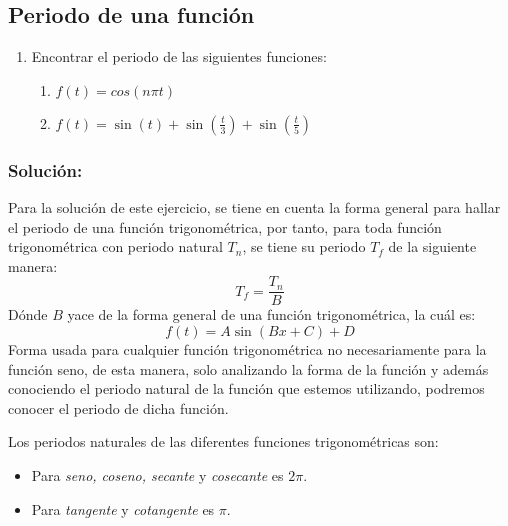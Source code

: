





\begin{multicols}{2}

\section{Periodo de una función}

\begin{enumerate}[leftmargin=15pt]
    \item Encontrar el periodo de las siguientes funciones:
    \begin{enumerate}
        \item $f(t) = cos \left(n \pi t\right)$ 
        \item $f(t) = \sin \left(t\right) + \sin \left(\frac{t}{3}\right) + \sin \left(\frac{t}{5}\right)$
    \end{enumerate} 
\end{enumerate}

\subsubsection*{\textbf{Solución:}}


Para la solución de este ejercicio, se tiene en cuenta la forma general para hallar el periodo de una función trigonométrica, por tanto, para toda función trigonométrica con periodo natural $T_n$, se tiene su periodo $T_f$ de la siguiente manera:
\begin{equation}
    T_f = \frac{T_n}{B}
\label{eq:1}
\end{equation}
Dónde $B$ yace de la forma general de una función trigonométrica, la cuál es:
\begin{equation*}
    f(t) = A\sin\left(Bx + C\right) + D
\end{equation*}
Forma usada para cualquier función trigonométrica no necesariamente para la función seno, de esta manera, solo analizando la forma de la función y además conociendo el periodo natural de la función que estemos utilizando, podremos conocer el periodo de dicha función.

Los periodos naturales de las diferentes funciones trigonométricas son:

\begin{itemize}
    \item Para \textit{seno, coseno, secante} y \textit{cosecante} es $2\pi$.
    \item Para \textit{tangente} y \textit{cotangente} es $\pi$.
\end{itemize}


\end{multicols}
